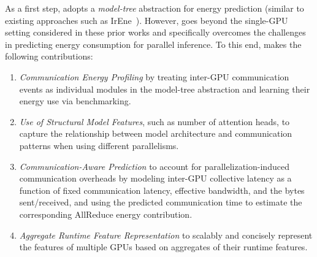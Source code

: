 As a first step, \sys{} adopts a \emph{model-tree} abstraction for energy prediction (similar to existing approaches such as IrEne~\cite{irene, neuralpower}). 
However, \sys{} goes beyond the single-GPU setting considered in these prior works and specifically overcomes the challenges in predicting energy consumption for parallel inference. To this end, \sys{} makes the following contributions: %
\begin{enumerate}
    \item 
\emph{Communication Energy Profiling} by treating inter-GPU communication events as individual modules in the model-tree abstraction and learning their energy use via benchmarking.
    \item \emph{Use of Structural Model Features}, such as number of attention heads, to capture the relationship between model architecture and communication patterns when using different parallelisms.
    \item \emph{Communication-Aware Prediction} to account for parallelization-induced communication overheads by modeling inter-GPU collective latency as a function of fixed communication latency, effective bandwidth, and the bytes sent/received, and using the predicted communication time to estimate the corresponding AllReduce energy contribution.

    \item \emph{Aggregate Runtime Feature Representation} to scalably and concisely represent the features of multiple GPUs
    based on aggregates of their runtime features. 
\end{enumerate}


